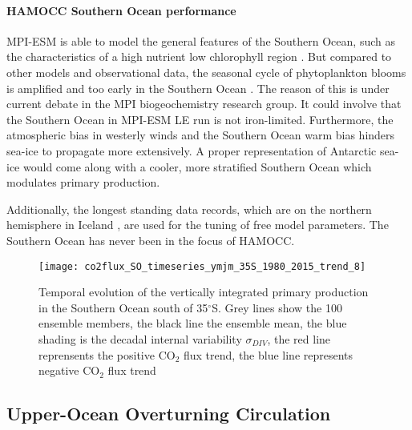 \documentclass[12pt]{article}
\begin{document}
\paragraph{HAMOCC Southern Ocean performance}
MPI-ESM is able to model the general features of the Southern Ocean, such as the characteristics of a high nutrient low chlorophyll region \citep{Bopp2013}. But compared to other models and observational data, the seasonal cycle of phytoplankton blooms is amplified and too early in the Southern Ocean \citep{Bopp2013,Nevison2016}. The reason of this is under current debate in the MPI biogeochemistry research group. It could involve that the Southern Ocean in MPI-ESM LE run is not iron-limited. Furthermore, the atmospheric bias in westerly winds and the Southern Ocean warm bias \citep{Jungclaus2013} hinders sea-ice to propagate more extensively. A proper representation of Antarctic sea-ice would come along with a cooler, more stratified Southern Ocean which modulates primary production.

Additionally, the longest standing data records, which are on the northern hemisphere in Iceland \citep{Six1996}, are used for the tuning of free model parameters. The Southern Ocean has never been in the focus of HAMOCC. 






\begin{figure}[h!]
	\centering
	\texttt{[image: co2flux\_SO\_timeseries\_ymjm\_35S\_1980\_2015\_trend\_8]}
	\caption{Temporal evolution of the vertically integrated primary production in the Southern Ocean south of 35$^\circ$S. Grey lines show the 100 ensemble members, the black line the ensemble mean, the blue shading is the decadal internal variability $\sigma_{DIV}$, the red line reprensents the positive CO$_2$ flux trend, the blue line represents negative CO$_2$ flux trend}
	\label{fig:evolution_southern_ocean_intpp}
\end{figure}




\clearpage

\subsection{Upper-Ocean Overturning Circulation}
\label{sec:UOOC}
\end{document}
